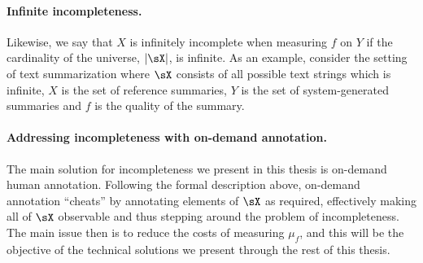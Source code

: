 \paragraph{Infinite incompleteness.}
Likewise, we say that $X$ is infinitely incomplete when measuring $f$ on $Y$ if the cardinality of the universe, $|\sX|$, is infinite.
As an example, consider the setting of text summarization where $\sX$ consists of all possible text strings which is infinite, $X$ is the set of reference summaries, $Y$ is the set of system-generated summaries and $f$ is the quality of the summary.

\paragraph{Addressing incompleteness with on-demand annotation.}
The main solution for incompleteness we present in this thesis is on-demand human annotation.
Following the formal description above, on-demand annotation ``cheats'' by annotating elements of $\sX$ as required, effectively making all of $\sX$ observable and thus stepping around the problem of incompleteness.
The main issue then is to reduce the costs of measuring $\mu_f$, and this will be the objective of the technical solutions we present through the rest of this thesis.

